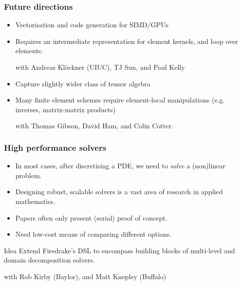 \documentclass[presentation]{beamer}
\begin{document}
\begin{frame}
  \frametitle{Future directions}
  \begin{itemize}
  \item Vectorisation and code generation for SIMD/GPUs
  \item Requires an intermediate representation for element kernels,
    and loop over elements.
    \begin{flushright}
      {\scriptsize with Andreas Kl\"ockner (UIUC), TJ Sun, and Paul
        Kelly}
    \end{flushright}
    \item Capture slightly wider class of tensor algebra
    \item Many finite element schemes require element-local
      manipulations (e.g. inverses, matrix-matrix products)
      \begin{flushright}
        {\scriptsize with Thomas Gibson, David Ham, and Colin Cotter.}
      \end{flushright}
    \end{itemize}
\end{frame}

\begin{frame}
  \frametitle{High performance solvers}
  \begin{itemize}
  \item In most cases, after discretising a PDE, we need to
    \emph{solve} a (non)linear problem.
  \item Designing robust, scalable solvers is a vast area of research
    in applied mathematics.
  \item Papers often only present (serial) proof of concept.
  \item Need low-cost means of comparing different options.
  \end{itemize}
  \begin{block}{Idea}
    Extend Firedrake's DSL to encompass building blocks of
    multi-level and domain decomposition solvers.
    \begin{flushright}
      {\scriptsize with Rob Kirby (Baylor), and Matt Knepley (Buffalo)}
    \end{flushright}
  \end{block}
\end{frame}
\end{document}
